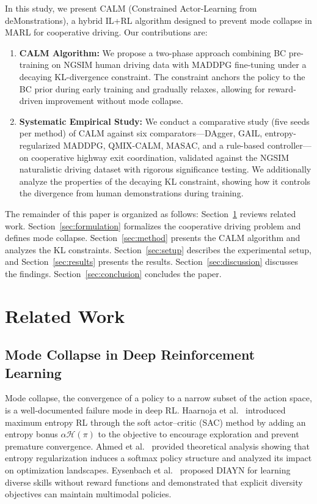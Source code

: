 \documentclass[journal]{IEEEtran}
\begin{document}
In this study, we present CALM (Constrained Actor-Learning from deMonstrations), a hybrid IL+RL algorithm designed to prevent mode collapse in MARL for cooperative driving. Our contributions are:

\begin{enumerate}
    \item \textbf{CALM Algorithm:} We propose a two-phase approach combining BC pre-training on NGSIM human driving data with MADDPG fine-tuning under a decaying KL-divergence constraint. The constraint anchors the policy to the BC prior during early training and gradually relaxes, allowing for reward-driven improvement without mode collapse.

    \item \textbf{Systematic Empirical Study:} We conduct a comparative study (five seeds per method) of CALM against six comparators---DAgger, GAIL, entropy-regularized MADDPG, QMIX-CALM, MASAC, and a rule-based controller---on cooperative highway exit coordination, validated against the NGSIM naturalistic driving dataset with rigorous significance testing. We additionally analyze the properties of the decaying KL constraint, showing how it controls the divergence from human demonstrations during training.
\end{enumerate}

The remainder of this paper is organized as follows: Section~\ref{sec:related} reviews related work. Section~\ref{sec:formulation} formalizes the cooperative driving problem and defines mode collapse. Section~\ref{sec:method} presents the CALM algorithm and analyzes the KL constraints. Section~\ref{sec:setup} describes the experimental setup, and Section~\ref{sec:results} presents the results. Section~\ref{sec:discussion} discusses the findings. Section~\ref{sec:conclusion} concludes the paper.

\section{Related Work}
\label{sec:related}

\subsection{Mode Collapse in Deep Reinforcement Learning}

Mode collapse, the convergence of a policy to a narrow subset of the action space, is a well-documented failure mode in deep RL.
Haarnoja et al.~\cite{haarnoja2018soft} introduced maximum entropy RL through the soft actor–critic (SAC) method by adding an entropy bonus $\alpha \mathcal{H}(\pi)$ to the objective to encourage exploration and prevent premature convergence.
Ahmed et al.~\cite{ahmed2019understanding} provided theoretical analysis showing that entropy regularization induces a softmax policy structure and analyzed its impact on optimization landscapes.
Eysenbach et al.~\cite{eysenbach2019diversity} proposed DIAYN for learning diverse skills without reward functions and demonstrated that explicit diversity objectives can maintain multimodal policies.
\end{document}
